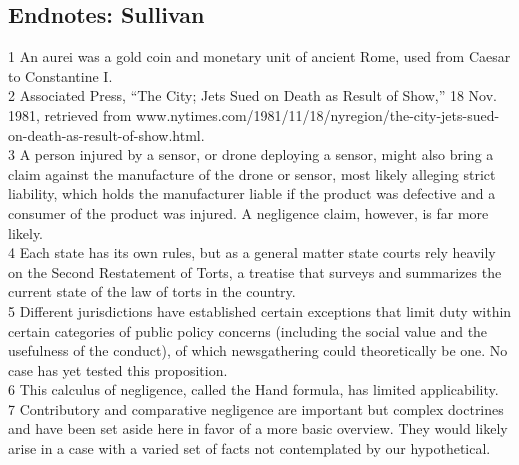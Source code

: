 \begin{itemize}
\section{Endnotes: Sullivan}
1 An aurei was a gold coin and monetary unit of ancient Rome, used from Caesar to Constantine I.\\
2 Associated Press, ``The City; Jets Sued on Death as Result of Show,'' 18 Nov. 1981, retrieved from
www.nytimes.com/1981/11/18/nyregion/the-city-jets-sued-on-death-as-result-of-show.html.\\
3 A person injured by a sensor, or drone deploying a sensor, might also bring a claim against
the manufacture of the drone or sensor, most likely alleging strict liability, which holds the
manufacturer liable if the product was defective and a consumer of the product was injured.
A negligence claim, however, is far more likely.\\
4 Each state has its own rules, but as a general matter state courts rely heavily on the Second
Restatement of Torts, a treatise that surveys and summarizes the current state of the law of
torts in the country.\\
5 Different jurisdictions have established certain exceptions that limit duty within certain categories
of public policy concerns (including the social value and the usefulness of the conduct), of which
newsgathering could theoretically be one. No case has yet tested this proposition.\\
6 This calculus of negligence, called the Hand formula, has limited applicability.\\
7 Contributory and comparative negligence are important but complex doctrines and have been set
aside here in favor of a more basic overview. They would likely arise in a case with a varied set of
facts not contemplated by our hypothetical.\\


\end{itemize}
